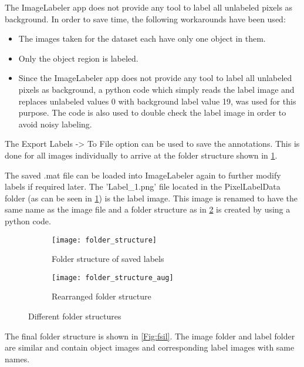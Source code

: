 \documentclass[paper=a4,11pt,parskip=half,toc=listof]{scrartcl}
\begin{document}
The ImageLabeler app does not provide any tool to label all unlabeled pixels as background. In order to save time, the following workarounds have been used:
	\begin{itemize}
		\item The images taken for the dataset each have only one object in them.
		\item Only the object region is labeled.
		\item Since the ImageLabeler app does not provide any tool to label all unlabeled pixels as background, a python code which simply reads the label image and replaces unlabeled values 0 with background label value 19, was used for this purpose. The code is also used to double check the label image in order to avoid noisy labeling.
	\end{itemize}
	
The Export Labels -> To File option can be used to save the annotations. This is done for all images individually to arrive at the folder structure shown in \ref{Fig:fsa}.
	
The saved .mat file can be loaded into ImageLabeler again to further modify labels if required later. The 'Label\_1.png' file located in the PixelLabelData folder (as can be seen in \ref{Fig:fsa}) is the label image. This image is renamed to have the same name as the image file and a folder structure as in \ref{Fig:fsb} is created by using a python code.
	
\begin{center}
	\begin{figure}[!htb]
		\begin{subfigure}{.5\textwidth}
			\centering
			\texttt{[image: folder\_structure]}
			\caption{Folder structure of saved labels}
			\label{Fig:fsa}
		\end{subfigure}
		\begin{subfigure}{.5\textwidth}
			\centering
			\texttt{[image: folder\_structure\_aug]}
			\caption{Rearranged folder structure}
			\label{Fig:fsb}
		\end{subfigure}
		\caption{Different folder structures}
		\label{Fig:fs}
	\end{figure}
\end{center}

The final folder structure is shown in \ref{Fig:fsil}. The image folder and label folder are similar and contain object images and corresponding label images with same names.
\end{document}
